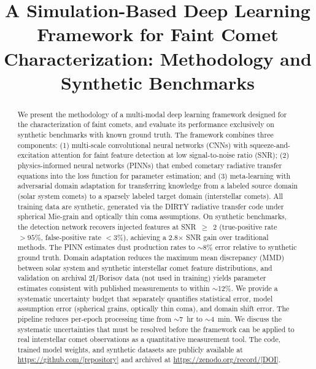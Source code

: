 \documentclass[preprint2]{aastex631}
\begin{document}
\title{A Simulation-Based Deep Learning Framework for Faint Comet Characterization: Methodology and Synthetic Benchmarks}


\accepted{}
\published{}

\begin{abstract}
We present the methodology of a multi-modal deep learning framework designed for the characterization of faint comets, and evaluate its performance exclusively on synthetic benchmarks with known ground truth. The framework combines three components: (1) multi-scale convolutional neural networks (CNNs) with squeeze-and-excitation attention for faint feature detection at low signal-to-noise ratio (SNR); (2) physics-informed neural networks (PINNs) that embed cometary radiative transfer equations into the loss function for parameter estimation; and (3) meta-learning with adversarial domain adaptation for transferring knowledge from a labeled source domain (solar system comets) to a sparsely labeled target domain (interstellar comets). All training data are synthetic, generated via the DIRTY radiative transfer code under spherical Mie-grain and optically thin coma assumptions. On synthetic benchmarks, the detection network recovers injected features at SNR~$\geq$~2 (true-positive rate $>95\%$, false-positive rate $<3\%$), achieving a 2.8$\times$ SNR gain over traditional methods. The PINN estimates dust production rates to $\sim$8\% error relative to synthetic ground truth. Domain adaptation reduces the maximum mean discrepancy (MMD) between solar system and synthetic interstellar comet feature distributions, and validation on archival 2I/Borisov data (not used in training) yields parameter estimates consistent with published measurements to within $\sim$12\%. We provide a systematic uncertainty budget that separately quantifies statistical error, model assumption error (spherical grains, optically thin coma), and domain shift error. The pipeline reduces per-epoch processing time from $\sim$7~hr to $\sim$4~min. We discuss the systematic uncertainties that must be resolved before the framework can be applied to real interstellar comet observations as a quantitative measurement tool. The code, trained model weights, and synthetic datasets are publicly available at \url{https://github.com/[repository]} and archived at \url{https://zenodo.org/record/[DOI]}.
\end{abstract}
\end{document}
